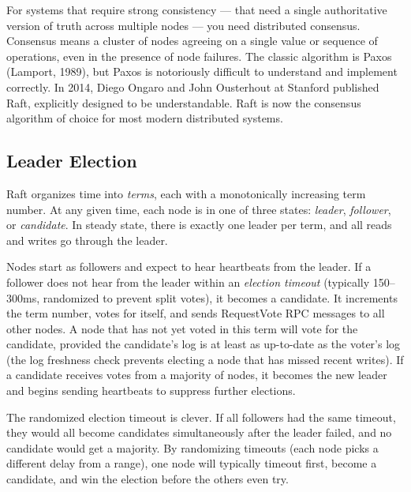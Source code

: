 \documentclass[11pt,a4paper]{article}
\begin{document}
For systems that require strong consistency --- that need a single authoritative version of truth across multiple nodes --- you need distributed consensus. Consensus means a cluster of nodes agreeing on a single value or sequence of operations, even in the presence of node failures. The classic algorithm is Paxos (Lamport, 1989), but Paxos is notoriously difficult to understand and implement correctly. In 2014, Diego Ongaro and John Ousterhout at Stanford published Raft, explicitly designed to be understandable. Raft is now the consensus algorithm of choice for most modern distributed systems.

\subsection{Leader Election}

Raft organizes time into \textit{terms}, each with a monotonically increasing term number. At any given time, each node is in one of three states: \textit{leader}, \textit{follower}, or \textit{candidate}. In steady state, there is exactly one leader per term, and all reads and writes go through the leader.

Nodes start as followers and expect to hear heartbeats from the leader. If a follower does not hear from the leader within an \textit{election timeout} (typically 150--300ms, randomized to prevent split votes), it becomes a candidate. It increments the term number, votes for itself, and sends RequestVote RPC messages to all other nodes. A node that has not yet voted in this term will vote for the candidate, provided the candidate's log is at least as up-to-date as the voter's log (the log freshness check prevents electing a node that has missed recent writes). If a candidate receives votes from a majority of nodes, it becomes the new leader and begins sending heartbeats to suppress further elections.

The randomized election timeout is clever. If all followers had the same timeout, they would all become candidates simultaneously after the leader failed, and no candidate would get a majority. By randomizing timeouts (each node picks a different delay from a range), one node will typically timeout first, become a candidate, and win the election before the others even try.
\end{document}

